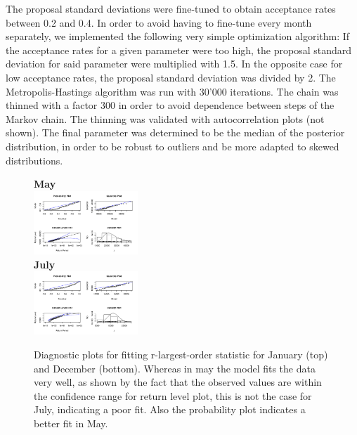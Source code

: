 \documentclass[10pt,conference,compsocconf]{IEEEtran}
\begin{document}
The proposal standard deviations were fine-tuned to obtain acceptance rates between 0.2 and 0.4. In order to avoid having to fine-tune every month separately, we implemented the following very simple optimization algorithm: If the acceptance rates for a given parameter were too high, the proposal standard deviation for said parameter were multiplied with 1.5. In the opposite case for low acceptance rates, the proposal standard deviation was divided by 2. The Metropolis-Hastings algorithm was run with 30'000 iterations. The chain was thinned with a factor 300 in order to avoid dependence between steps of the Markov chain. The thinning was validated with autocorrelation plots (not shown). The final parameter was determined to be the median of the posterior distribution, in order to be robust to outliers and be more adapted to skewed distributions. 
\par
\begin{figure}
	\centering
	\textbf{May}\\
	\includegraphics[width=0.35\textwidth]{../plots/r_larg_diag_may.pdf}\\
	\textbf{July}\\
	\includegraphics[width=0.35\textwidth]{../plots/r_larg_diag_july.pdf}
	\caption{Diagnostic plots for fitting r-largest-order statistic for January (top) and December (bottom). Whereas in may the model fits the data very well, as shown by the fact that the observed values are within the confidence range for return level plot, this is not the case for July, indicating a poor fit. Also the probability plot indicates a better fit in May.}
	\label{fig:r_diag}
\end{figure}
\end{document}
